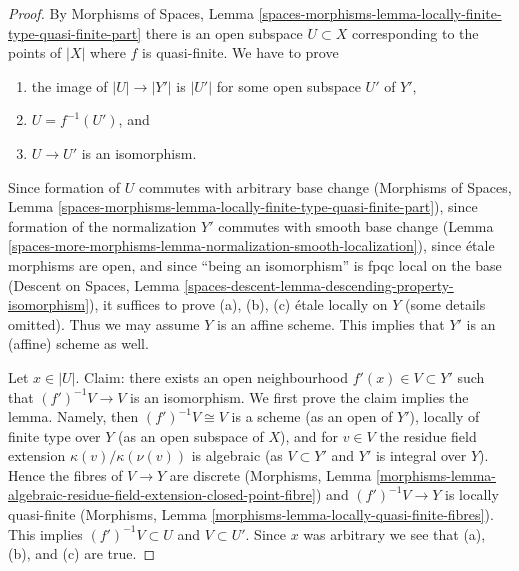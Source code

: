 \begin{proof}
By Morphisms of Spaces, Lemma
\ref{spaces-morphisms-lemma-locally-finite-type-quasi-finite-part}
there is an open subspace $U \subset X$ corresponding to the points
of $|X|$ where $f$ is quasi-finite. We have to prove
\begin{enumerate}
\item[(a)] the image of $|U| \to |Y'|$ is $|U'|$ for some open subspace
$U'$ of $Y'$,
\item[(b)] $U = f^{-1}(U')$, and
\item[(c)] $U \to U'$ is an isomorphism.
\end{enumerate}
Since formation of $U$ commutes with arbitrary base change
(Morphisms of Spaces, Lemma
\ref{spaces-morphisms-lemma-locally-finite-type-quasi-finite-part}),
since formation of the normalization $Y'$ commutes with smooth
base change (Lemma \ref{spaces-more-morphisms-lemma-normalization-smooth-localization}),
since \'etale morphisms are open, and
since ``being an isomorphism'' is fpqc local on the base
(Descent on Spaces, Lemma
\ref{spaces-descent-lemma-descending-property-isomorphism}),
it suffices to prove (a), (b), (c) \'etale locally on $Y$
(some details omitted). Thus
we may assume $Y$ is an affine scheme. This implies that $Y'$ is
an (affine) scheme as well.

\medskip\noindent
Let $x \in |U|$. Claim: there exists an open
neighbourhood $f'(x) \in V \subset Y'$ such that $(f')^{-1}V \to V$ is an
isomorphism. We first prove the claim implies the lemma.
Namely, then $(f')^{-1}V \cong V$ is a scheme (as an open
of $Y'$), locally of finite type over $Y$ (as an open subspace of $X$),
and for $v \in V$ the residue field extension
$\kappa(v)/\kappa(\nu(v))$ is algebraic (as
$V \subset Y'$ and $Y'$ is integral over $Y$). Hence the fibres
of $V \to Y$ are discrete (Morphisms, Lemma
\ref{morphisms-lemma-algebraic-residue-field-extension-closed-point-fibre})
and $(f')^{-1}V \to Y$ is locally quasi-finite
(Morphisms, Lemma \ref{morphisms-lemma-locally-quasi-finite-fibres}).
This implies $(f')^{-1}V \subset U$ and $V \subset U'$. Since $x$ was
arbitrary we see that (a), (b), and (c) are true.


\end{proof}
